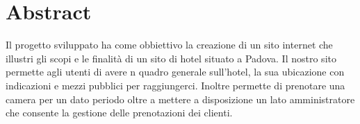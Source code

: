 \section{Abstract}
Il progetto sviluppato ha come obbiettivo la creazione di un sito internet che illustri gli scopi e le finalità di un sito di hotel situato a Padova.
Il nostro sito permette agli utenti di avere n quadro generale sull'hotel, la sua ubicazione con indicazioni e mezzi pubblici per raggiungerci. Inoltre permette di prenotare una camera per un dato periodo oltre a mettere a disposizione un lato amministratore che consente la gestione delle prenotazioni dei clienti.
